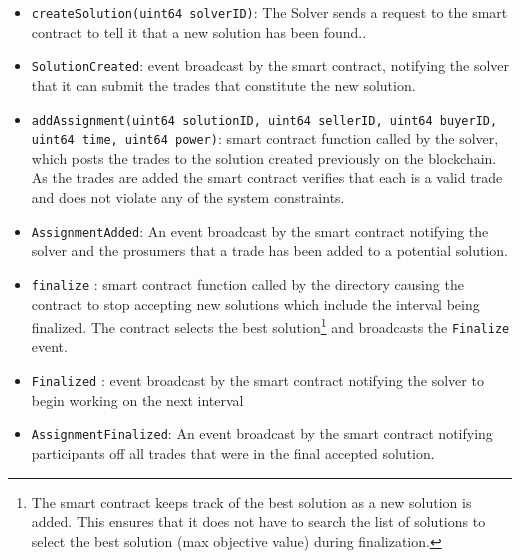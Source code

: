 \begin{itemize}[leftmargin=*]
\item \texttt{createSolution(uint64 solverID)}: The Solver sends a request to the smart contract to tell it that a new solution has been found..
\item \texttt{SolutionCreated}: event broadcast by the smart contract, notifying the solver that it can submit the trades that constitute the new solution.
\item \texttt{addAssignment(uint64 solutionID, uint64 sellerID, uint64 buyerID, uint64 time, uint64 power)}: smart contract function called by the solver, which posts the trades to the solution created previously on the blockchain. As the trades are added the smart contract verifies that each is a valid trade and does not violate any of the system constraints.
\item \texttt{AssignmentAdded}: An event broadcast by the smart contract notifying the solver and the prosumers that a trade has been added to a potential solution. 
\item \texttt{finalize} : smart contract function called by the directory causing the contract to stop accepting new solutions which include the interval being finalized. The contract selects the best solution\footnote{The smart contract keeps track of the best solution as a new solution is added. This ensures that it does not have to search the list of solutions to select the best solution (max objective value) during finalization.} and broadcasts the \texttt{Finalize} event. 
\item \texttt{Finalized} : event broadcast by the smart contract notifying the solver to begin working on the next interval
\item \texttt{AssignmentFinalized}: An event broadcast by the smart contract notifying participants off all trades that were in the final accepted solution. 
\end{itemize}
